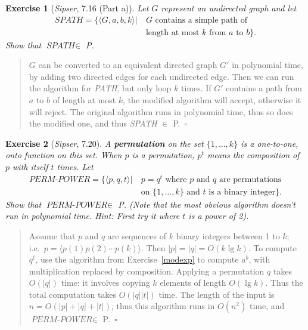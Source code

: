\documentclass{article}
\theoremstyle{break}			%
\newtheorem{exercise}{Exercise}
\theoremstyle{plain}
\newenvironment{answer}{\begin{quotation}\noindent}{\end{quotation}}
\newcommand{\sipser}{\textit{Sipser}}
\newcommand{\encoding}[1]{\ensuremath{\langle#1\rangle}}
\renewcommand{\qed}{~\ensuremath{\square}}
\newcommand{\defin}[1]{\textbf{\textit{#1}}}
\newcommand{\setname}[1]{\textit{#1}}
\begin{document}
\begin{exercise}[\sipser, 7.16 (Part a)]
Let $G$ represent an undirected graph and let
\begin{align*}
\setname{SPATH}=\{\encoding{G,a,b,k}|~
&G\text{ contains a simple path of}\\
&\text{length at most $k$ from $a$ to $b$}\}.
\end{align*}
Show that $\setname{SPATH}\in$ P.
\end{exercise}
\begin{answer}
$G$ can be converted to an equivalent directed graph $G'$ in
polynomial time, by adding two directed edges for each undirected
edge.  Then we can run the algorithm for \setname{PATH}, but only loop
$k$ times.  If $G'$ contains a path from $a$ to $b$ of length at most
$k$, the modified algorithm will accept, otherwise it will reject.
The original algorithm runs in polynomial time, thus so does the
modified one, and thus \setname{SPATH} $\in$ P.\qed
\end{answer}

\begin{exercise}[\sipser, 7.20]
A \defin{permutation} on the set $\{1,\ldots,k\}$ is a one-to-one,
onto function on this set.  When $p$ is a permutation, $p^t$ means the
composition of $p$ with itself $t$ times.  Let
\begin{align*}
\setname{PERM-POWER}=\{\encoding{p,q,t}|~
&p=q^t \text{ where $p$ and $q$ are permutations}\\
&\text{on $\{1,\ldots,k\}$ and $t$ is a binary integer}\}.
\end{align*}
Show that $\setname{PERM-POWER}\in$ P.  (Note that the most obvious
algorithm doesn't run in polynomial time.  Hint: First try it where
$t$ is a power of 2).
\end{exercise}
\begin{answer}
Assume that $p$ and $q$ are sequences of $k$ binary integers between 1
to $k$; i.e.~$p=\encoding{p(1)p(2)\cdots p(k)}$.  Then
$|p|=|q|=O(k\lg k)$.  To compute $q^t$, use the algorithm from
Exercise~\ref{modexp} to compute $a^b$, with multiplication replaced
by composition. Applying a permutation $q$ takes $O(|q|)$ time: it
involves copying $k$ elements of length $O(\lg k)$.  Thus the total
computation takes $O(|q||t|)$ time.  The length of the input is
$n=O(|p|+|q|+|t|)$, thus this algorithm runs in $O(n^2)$ time, and
$\setname{PERM-POWER}\in$ P.\qed
\end{answer}
\end{document}
